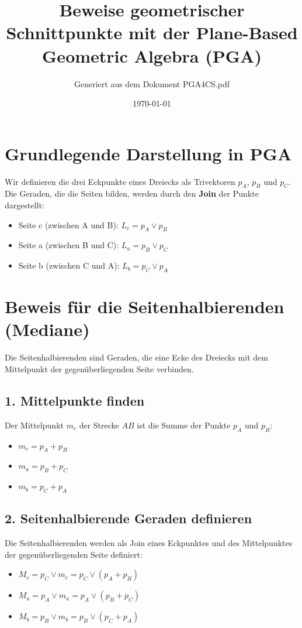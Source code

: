 \documentclass{article}
\title{Beweise geometrischer Schnittpunkte mit der Plane-Based Geometric Algebra (PGA)}
\author{Generiert aus dem Dokument PGA4CS.pdf}
\date{\today}
\begin{document}
\maketitle

\section{Grundlegende Darstellung in PGA}

Wir definieren die drei Eckpunkte eines Dreiecks als Trivektoren $p_A$, $p_B$ und $p_C$. Die Geraden, die die Seiten bilden, werden durch den \textbf{Join} der Punkte dargestellt:
\begin{itemize}
    \item Seite c (zwischen A und B): $L_c = p_A \vee p_B$
    \item Seite a (zwischen B und C): $L_a = p_B \vee p_C$
    \item Seite b (zwischen C und A): $L_b = p_C \vee p_A$
\end{itemize}

\section{Beweis für die Seitenhalbierenden (Mediane)}

Die Seitenhalbierenden sind Geraden, die eine Ecke des Dreiecks mit dem Mittelpunkt der gegenüberliegenden Seite verbinden.

\subsection*{1. Mittelpunkte finden}
Der Mittelpunkt $m_c$ der Strecke $AB$ ist die Summe der Punkte $p_A$ und $p_B$:
\begin{itemize}
    \item $m_c = p_A + p_B$
    \item $m_a = p_B + p_C$
    \item $m_b = p_C + p_A$
\end{itemize}

\subsection*{2. Seitenhalbierende Geraden definieren}
Die Seitenhalbierenden werden als Join eines Eckpunktes und des Mittelpunktes der gegenüberliegenden Seite definiert:
\begin{itemize}
    \item $M_c = p_C \vee m_c = p_C \vee (p_A + p_B)$
    \item $M_a = p_A \vee m_a = p_A \vee (p_B + p_C)$
    \item $M_b = p_B \vee m_b = p_B \vee (p_C + p_A)$
\end{itemize}
\end{document}
